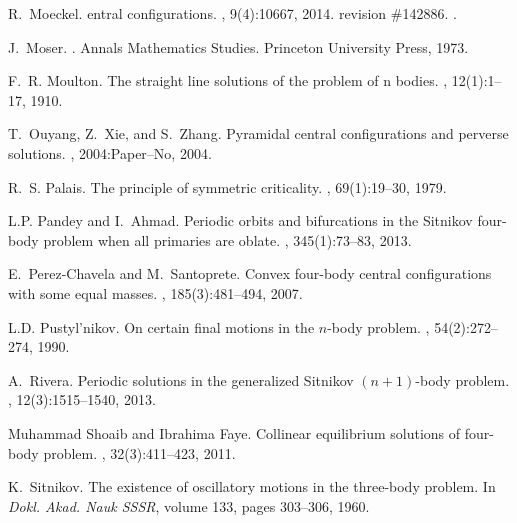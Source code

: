 \documentclass[smallcondensed]{svjour3}
\begin{document}
\begin{thebibliography}{10}
R.~Moeckel.
entral configurations.
, 9(4):10667, 2014.
\newblock revision \#142886.
\newblock \href {http://dx.doi.org/10.4249/scholarpedia.10667}
  {}.

J.~Moser.
.
\newblock Annals Mathematics Studies. Princeton University Press, 1973.

F.~R. Moulton.
\newblock The straight line solutions of the problem of n bodies.
, 12(1):1--17, 1910.

T.~Ouyang, Z.~Xie, and S.~Zhang.
\newblock Pyramidal central configurations and perverse solutions.
, 2004:Paper--No, 2004.

R.~S. Palais.
\newblock The principle of symmetric criticality.
, 69(1):19--30, 1979.

L.P. Pandey and I.~Ahmad.
\newblock Periodic orbits and bifurcations in the {S}itnikov four-body problem
  when all primaries are oblate.
, 345(1):73--83, 2013.

E.~Perez-Chavela and M.~Santoprete.
\newblock Convex four-body central configurations with some equal masses.
, 185(3):481--494,
  2007.

L.D. Pustyl'nikov.
\newblock On certain final motions in the $n$-body problem.
, 54(2):272--274,
  1990.

A.~Rivera.
\newblock Periodic solutions in the generalized {S}itnikov $(n+1)$-body
  problem.
, 12(3):1515--1540,
  2013.

Muhammad Shoaib and Ibrahima Faye.
\newblock Collinear equilibrium solutions of four-body problem.
, 32(3):411--423, 2011.

K.~{S}itnikov.
\newblock The existence of oscillatory motions in the three-body problem.
\newblock In {\em Dokl. Akad. Nauk SSSR}, volume 133, pages 303--306, 1960.


\end{thebibliography}
\end{document}
